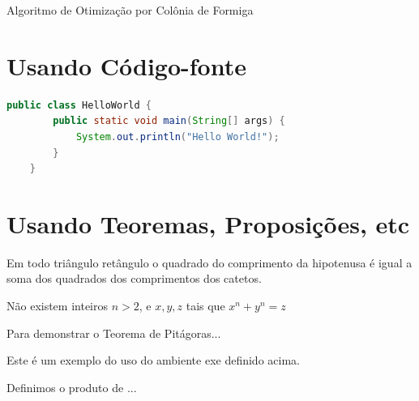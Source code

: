 \begin{algorithm}[h!]
	\SetSpacedAlgorithm
	\caption{\label{alg:algoritmo_de_colonica_de_formigas}Algoritmo de Otimização por Colônia de Formiga}
\end{algorithm}


\section{Usando Código-fonte}





\begin{lstlisting}[language=Java,caption={Hello World em Java}]
	public class HelloWorld {
		public static void main(String[] args) {
			System.out.println("Hello World!");
		}
	}
\end{lstlisting}


\section{Usando Teoremas, Proposições, etc}


\begin{teo}[Pitágoras]
	Em todo triângulo retângulo o quadrado do comprimento da
	hipotenusa é igual a soma dos quadrados dos comprimentos dos catetos.
\end{teo}



\begin{teo}[Fermat]
	Não existem inteiros $n > 2$, e $x, y, z$ tais que $x^n + y^n = z$
\end{teo}


\begin{prop}
	Para demonstrar o Teorema de Pitágoras...
\end{prop}


\begin{exem}
	Este é um exemplo do uso do ambiente exe definido acima.
\end{exem}


\begin{xdefinicao}
	Definimos o produto de ...
\end{xdefinicao}


